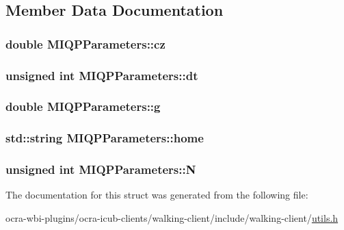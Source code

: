 \subsection{\-Member \-Data \-Documentation}
\hypertarget{structMIQPParameters_ab8158e2bf119d70c9856b6a277e3c42a}{
\subsubsection[{cz}]{\setlength{\rightskip}{0pt plus 5cm}double {\bf \-M\-I\-Q\-P\-Parameters\-::cz}}}\label{structMIQPParameters_ab8158e2bf119d70c9856b6a277e3c42a}
\hypertarget{structMIQPParameters_ab4fca30503423e047dc55d27f0c9f3c9}{
\subsubsection[{dt}]{\setlength{\rightskip}{0pt plus 5cm}unsigned int {\bf \-M\-I\-Q\-P\-Parameters\-::dt}}}\label{structMIQPParameters_ab4fca30503423e047dc55d27f0c9f3c9}
\hypertarget{structMIQPParameters_a31eca71d200b5b1468bd60b3266d0688}{
\subsubsection[{g}]{\setlength{\rightskip}{0pt plus 5cm}double {\bf \-M\-I\-Q\-P\-Parameters\-::g}}}\label{structMIQPParameters_a31eca71d200b5b1468bd60b3266d0688}
\hypertarget{structMIQPParameters_a351843e2933021d2ed3abb00a9d001ff}{
\subsubsection[{home}]{\setlength{\rightskip}{0pt plus 5cm}std\-::string {\bf \-M\-I\-Q\-P\-Parameters\-::home}}}\label{structMIQPParameters_a351843e2933021d2ed3abb00a9d001ff}
\hypertarget{structMIQPParameters_a7545bc29708292cbfca22b0446180f7c}{
\subsubsection[{\-N}]{\setlength{\rightskip}{0pt plus 5cm}unsigned int {\bf \-M\-I\-Q\-P\-Parameters\-::\-N}}}\label{structMIQPParameters_a7545bc29708292cbfca22b0446180f7c}


\-The documentation for this struct was generated from the following file\-:\begin{DoxyCompactItemize}
\item 
ocra-\/wbi-\/plugins/ocra-\/icub-\/clients/walking-\/client/include/walking-\/client/\hyperlink{utils_8h}{utils.\-h}\end{DoxyCompactItemize}
